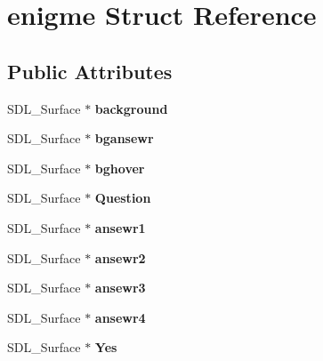 \hypertarget{structenigme}{}\section{enigme Struct Reference}
\label{structenigme}
\subsection*{Public Attributes}
\begin{DoxyCompactItemize}
\item 
\mbox{\label{structenigme_afef580eaca259227dac7bbae2d09f8f7}} 
S\+D\+L\+\_\+\+Surface $\ast$ {\bfseries background}
\item 
\mbox{\label{structenigme_a10ee397636fe45d16379476fb990c58a}} 
S\+D\+L\+\_\+\+Surface $\ast$ {\bfseries bgansewr}
\item 
\mbox{\label{structenigme_aebbf2d7046b5e0545f7b84fef6e98831}} 
S\+D\+L\+\_\+\+Surface $\ast$ {\bfseries bghover}
\item 
\mbox{\label{structenigme_a917462fa7abd51385bfb39274d24c11f}} 
S\+D\+L\+\_\+\+Surface $\ast$ {\bfseries Question}
\item 
\mbox{\label{structenigme_ab3a0b156348a72483447216e90c28af0}} 
S\+D\+L\+\_\+\+Surface $\ast$ {\bfseries ansewr1}
\item 
\mbox{\label{structenigme_a97c066a4114758708b5b4400f07de023}} 
S\+D\+L\+\_\+\+Surface $\ast$ {\bfseries ansewr2}
\item 
\mbox{\label{structenigme_a49754c0a7b2de36218e07574b0df6ea4}} 
S\+D\+L\+\_\+\+Surface $\ast$ {\bfseries ansewr3}
\item 
\mbox{\label{structenigme_a4eb7509adf07f09049e9a375d249bea6}} 
S\+D\+L\+\_\+\+Surface $\ast$ {\bfseries ansewr4}
\item 
\mbox{\label{structenigme_ad4909b90c50cc4caf5d702e18f83e335}} 
S\+D\+L\+\_\+\+Surface $\ast$ {\bfseries Yes}
\item 
\mbox{\label{structenigme_a630ac6f3949179ec340c9e71ad53faee}} 

\end{DoxyCompactItemize}

